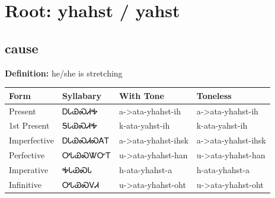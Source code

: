 \documentclass{article}%
\begin{document}
%
\normalsize%
\section*{Root: yhahst / yahst}%
\subsection*{cause}%
\textbf{Definition: }%
he/she is stretching%
\\[0.5em]%
\begin{tabular}{|l|l|l|l|}%
\hline%
\textbf{Form}&\textbf{Syllabary}&\textbf{With Tone}&\textbf{Toneless}\\%
\hline%
Present&ᎠᏓᏯᏍᏗᎭ&a{-}>ata{-}yhahst{-}ih&a{-}>ata{-}yhahst{-}ih\\%
1st Present&ᎦᏓᏯᏍᏗᎭ&k{-}ata{-}yahst{-}ih&k{-}ata{-}yahst{-}ih\\%
Imperfective&ᎠᏓᏯᏍᏗᏍᎪᎢ&a{-}>ata{-}yhahst{-}ihsk&a{-}>ata{-}yhahst{-}ihsk\\%
Perfective&ᎤᏓᏯᏍᏔᏅᎢ&u{-}>ata{-}yhahst{-}han&u{-}>ata{-}yhahst{-}han\\%
Imperative&ᎭᏓᏯᏍᏓ&h{-}ata{-}yhahst{-}a&h{-}ata{-}yhahst{-}a\\%
Infinitive&ᎤᏓᏯᏍᏙᏗ&u{-}>ata{-}yhahst{-}oht&u{-}>ata{-}yhahst{-}oht\\%
\hline%
\end{tabular}%
\\[1em]%
\end{document}
